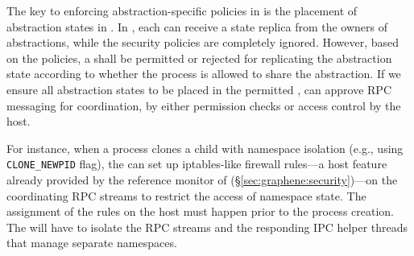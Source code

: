 The key to enforcing abstraction-specific policies in \liboses{}
is the placement of abstraction states
in \picoprocs{}.
In \graphene{}, each \picoproc{} can receive a state replica
from the owners of abstractions,
while the security policies are completely ignored.
However, based on the policies,
a \picoproc{} shall be permitted or rejected for
replicating the abstraction state according to whether the process is allowed to share the abstraction.
If we ensure all abstraction states to be placed in the permitted \picoprocs{},
\liboses{} can approve RPC messaging for coordination,
by either permission checks
or access control by the host.

For instance,
when a process clones a child with namespace isolation
(e.g., using {\tt CLONE\_NEWPID} flag),
the \libos{} can set up iptables-like firewall rules---a host feature
already provided by the reference monitor of \graphene{} (\S\ref{sec:graphene:security})---on the coordinating RPC streams
to restrict the access of namespace state.
The assignment of the rules on the host must happen
prior to the process creation.
The \libos{} will have to isolate the RPC streams and the responding IPC helper threads that manage separate namespaces.







